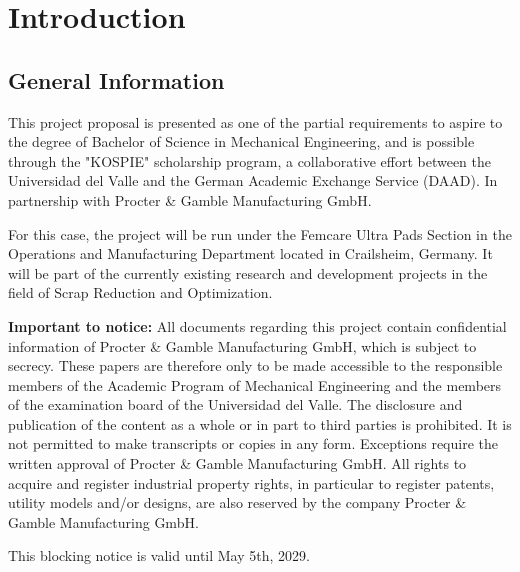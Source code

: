 \chapter{Introduction}\label{Ch1}

\section{General Information}

This project proposal is presented as one of the partial requirements to aspire to the degree of Bachelor of Science in Mechanical Engineering, and is possible through the "KOSPIE" scholarship program, a collaborative effort between the Universidad del Valle and the German Academic Exchange Service (DAAD). In partnership with Procter \& Gamble Manufacturing GmbH.

For this case, the project will be run under the Femcare Ultra Pads Section in the Operations and Manufacturing Department located in Crailsheim, Germany. It will be part of the currently existing research and development projects in the field of Scrap Reduction and Optimization. 

\textbf{Important to notice:} All documents regarding this project contain confidential information of 
Procter \& Gamble Manufacturing GmbH, which is subject to secrecy. These papers are therefore only to be made 
accessible to the responsible members of the Academic Program of Mechanical Engineering and 
the members of the examination board of the Universidad del Valle. The disclosure and publication 
of the content as a whole or in part to third parties is prohibited. It is not permitted to make 
transcripts or copies in any form. Exceptions require the written approval of Procter \& Gamble Manufacturing GmbH. All rights to 
acquire and register industrial property rights, in particular to register patents, utility models and/or 
designs, are also reserved by the company Procter \& Gamble Manufacturing GmbH. 

This blocking notice is valid until May 5th, 2029.


